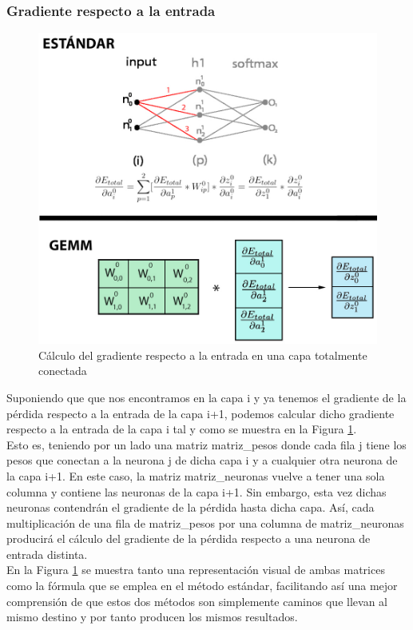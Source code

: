 \subsubsection{Gradiente respecto a la entrada}
\begin{figure}[H]
	\centering
	\includegraphics[scale=0.35]{imagenes/gemm_fully_back_input.jpg}  
	\caption{Cálculo del gradiente respecto a la entrada en una capa totalmente conectada}
	\label{fig:gemm_fully_back_input}
\end{figure}

Suponiendo que que nos encontramos en la capa i y ya tenemos el gradiente de la pérdida respecto a la entrada de la capa i+1, podemos calcular dicho gradiente respecto a la entrada de la capa i tal y como se muestra en la Figura \ref{fig:gemm_fully_back_input}. \\
Esto es, teniendo por un lado una matriz matriz\_pesos donde cada fila j tiene los pesos que conectan a la neurona j de dicha capa i y a cualquier otra neurona de la capa i+1. En este caso, la matriz matriz\_neuronas vuelve a tener una sola columna y contiene las neuronas de la capa i+1. Sin embargo, esta vez dichas neuronas contendrán el gradiente de la pérdida hasta dicha capa. Así, cada multiplicación de una fila de matriz\_pesos por una columna de matriz\_neuronas producirá el cálculo del gradiente de la pérdida respecto a una neurona de entrada distinta. \\
En la Figura \ref{fig:gemm_fully_back_input} se muestra tanto una representación visual de ambas matrices como la fórmula que se emplea en el método estándar, facilitando así una mejor comprensión de que estos dos métodos son simplemente caminos que llevan al mismo destino y por tanto producen los mismos resultados.

